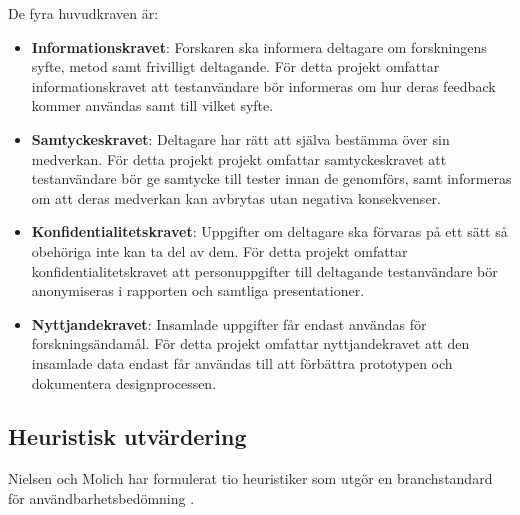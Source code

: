 De fyra huvudkraven är:
\begin{itemize}
    \item \textbf{Informationskravet}: Forskaren ska informera deltagare om forskningens syfte, metod samt frivilligt deltagande. För detta projekt omfattar informationskravet att testanvändare bör informeras om hur deras feedback kommer användas samt till vilket syfte. 
    \item \textbf{Samtyckeskravet}: Deltagare har rätt att själva bestämma över sin medverkan. För detta projekt projekt omfattar samtyckeskravet att testanvändare bör ge samtycke till tester innan de genomförs, samt informeras om att deras medverkan kan avbrytas utan negativa konsekvenser. 
    \item \textbf{Konfidentialitetskravet}: Uppgifter om deltagare ska förvaras på ett sätt så obehöriga inte kan ta del av dem. För detta projekt omfattar konfidentialitetskravet att personuppgifter till deltagande testanvändare bör anonymiseras i rapporten och samtliga presentationer. 
    \item \textbf{Nyttjandekravet}: Insamlade uppgifter får endast användas för forskningsändamål. För detta projekt omfattar nyttjandekravet att den insamlade data endast får användas till att förbättra prototypen och dokumentera designprocessen. 
\end{itemize}

\subsection{Heuristisk utvärdering}
Nielsen och Molich har formulerat tio heuristiker som utgör en branchstandard för användbarhetsbedömning \cite{nielsen1994}. 

